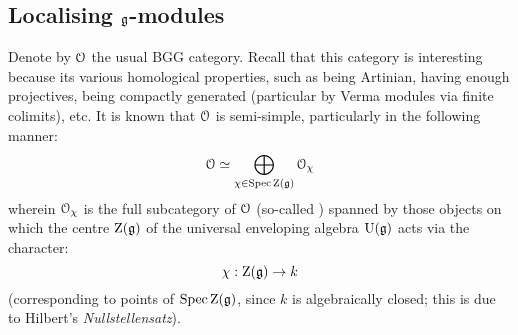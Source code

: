     \subsection{Localising \texorpdfstring{$\mathfrak{g}$}{}-modules}
        Denote by $\mathcal{O}$ the usual BGG category. Recall that this category is interesting because its various homological properties, such as being Artinian, having enough projectives, being compactly generated (particular by Verma modules via finite colimits), etc. It is known that $\mathcal{O}$ is semi-simple, particularly in the following manner:
            $$\mathcal{O} \simeq \bigoplus_{\chi \in \operatorname{Spec} \mathrm{Z}(\mathfrak{g})} \mathcal{O}_{\chi}$$
        wherein $\mathcal{O}_{\chi}$ is the full subcategory of $\mathcal{O}$ (so-called ) spanned by those objects on which the centre $\mathrm{Z}(\mathfrak{g})$ of the universal enveloping algebra $\mathrm{U}(\mathfrak{g})$ acts via the character:
            $$\chi: \mathrm{Z}(\mathfrak{g}) \to k$$
        (corresponding to points of $\operatorname{Spec} \mathrm{Z}(\mathfrak{g})$, since $k$ is algebraically closed; this is due to Hilbert's \textit{Nullstellensatz}).